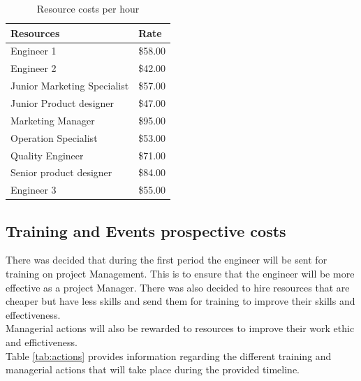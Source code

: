 \begin{table}[]
\centering
\caption{Resource costs per hour}
\label{tab:resourcecosts}
\begin{tabular}{ll}
\textbf{Resources}          & \textbf{Rate} \\\hline
Engineer 1                  & \$58.00       \\
Engineer 2                  & \$42.00       \\
Junior Marketing Specialist & \$57.00       \\
Junior Product designer     & \$47.00       \\
Marketing Manager           & \$95.00       \\
Operation Specialist        & \$53.00       \\
Quality Engineer            & \$71.00       \\
Senior product designer     & \$84.00       \\
Engineer 3                  & \$55.00      
\end{tabular}
\end{table}

\subsection{Training and Events prospective costs}

There was decided that during the first period the engineer will be sent for training on project Management. This is to ensure that the engineer will be more effective as a project Manager. There was also decided to hire resources that are cheaper but have less skills and send them for training to improve their skills and effectiveness.\\

\noindent
Managerial actions will also be rewarded to resources to improve their work ethic and effictiveness.\\

\noindent
Table \ref{tab:actions} provides information regarding the different training and managerial actions that will take place during the provided timeline.

